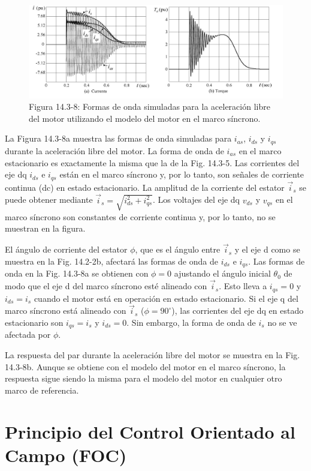 \documentclass[letterpaper,12pt]{article}
\begin{document}
\begin{figure}[ht]
\centering
\includegraphics{graficos/img10.jpg}
\caption{Figura 14.3-8: Formas de onda simuladas para la aceleración libre del motor utilizando el modelo del motor en el marco síncrono.}
\end{figure}
\FloatBarrier

La Figura 14.3-8a muestra las formas de onda simuladas para $i_{as}$, $i_{ds}$ y $i_{qs}$ durante la aceleración libre del motor. La forma de onda de $i_{as}$ en el marco estacionario es exactamente la misma que la de la Fig. 14.3-5. Las corrientes del eje dq $i_{ds}$ e $i_{qs}$ están en el marco síncrono y, por lo tanto, son señales de corriente continua (dc) en estado estacionario. La amplitud de la corriente del estator $\vec{i}_s$ se puede obtener mediante $\vec{i}_s = \sqrt{i_{ds}^2 + i_{qs}^2}$. Los voltajes del eje dq $v_{ds}$ y $v_{qs}$ en el marco síncrono son constantes de corriente continua y, por lo tanto, no se muestran en la figura.

El ángulo de corriente del estator $\phi$, que es el ángulo entre $\vec{i}_s$ y el eje d como se muestra en la Fig. 14.2-2b, afectará las formas de onda de $i_{ds}$ e $i_{qs}$. Las formas de onda en la Fig. 14.3-8a se obtienen con $\phi = 0$ ajustando el ángulo inicial $\theta_0$ de modo que el eje d del marco síncrono esté alineado con $\vec{i}_s$. Esto lleva a $i_{qs} = 0$ y $i_{ds} = i_s$ cuando el motor está en operación en estado estacionario. Si el eje q del marco síncrono está alineado con $\vec{i}_s$ ($\phi = 90^\circ$), las corrientes del eje dq en estado estacionario son $i_{qs} = i_s$ y $i_{ds} = 0$. Sin embargo, la forma de onda de $i_s$ no se ve afectada por $\phi$.

La respuesta del par durante la aceleración libre del motor se muestra en la Fig. 14.3-8b. Aunque se obtiene con el modelo del motor en el marco síncrono, la respuesta sigue siendo la misma para el modelo del motor en cualquier otro marco de referencia.

\section{Principio del Control Orientado al Campo (FOC)}
\end{document}
